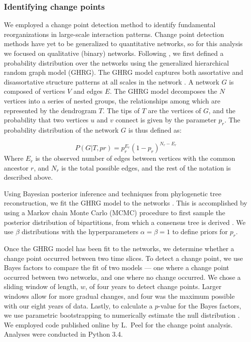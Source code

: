 \documentclass[12pt]{article}
\begin{document}
\subsubsection*{Identifying change points}
We employed a change point detection method \citep{peel2014detecting}
to identify fundamental reorganizations in large-scale interaction
patterns. Change point detection methods have yet to be generalized to
quantitative networks, so for this analysis we focused on qualitative
(binary) networks. Following \cite{peel2014detecting}, we first
defined a probability distribution over the networks using the
generalized hierarchical random graph model (GHRG). The GHRG model
captures both assortative and disassortative structure patterns at all
scales in the network \citep{peel2014detecting}. A network $G$ is
composed of vertices $V$ and edges $E$. The GHRG model decomposes the
$N$ vertices into a series of nested groups, the relationships among
which are represented by the dendrogram $T$. The tips of $T$ are the
vertices of $G$, and the probability that two vertices $u$ and $v$
connect is given by the parameter $p_r$. The probability distribution
of the network $G$ is thus defined as:

\begin{equation}
  \label{eq:lik}
  P(G|T,{pr}) = p_r^{E_r}(1-p_r)^{N_r-E_r}
\end{equation}
% 
Where $E_r$ is the observed number of edges between vertices with the
common ancestor $r$, and $N_r$ is the total possible edges, and the
rest of the notation is described above.

Using Bayesian posterior inference and techniques from phylogenetic
tree reconstruction, we fit the GHRG model to the networks
\citep{peel2014detecting}. This is accomplished by using a Markov
chain Monte Carlo (MCMC) procedure to first sample the posterior
distribution of bipartitions, from which a consensus tree is derived
\citep{peel2014detecting}. We use $\beta$ distributions with the
hyperparameters $\alpha=\beta=1$ to define priors for $p_r$.

Once the GHRG model has been fit to the networks, we determine whether
a change point occurred between two time slices. To detect a change
point, we use Bayes factors to compare the fit of two models --- one
where a change point occurred between two networks, and one where no
change occurred. We chose a sliding window of length, $w$, of four
years to detect change points. Larger windows allow for more gradual
changes, and four was the maximum possible with our eight years of
data. Lastly, to calculate a $p$-value for the Bayes factors, we use
parametric bootstrapping to numerically estimate the null distribution
\citep{peel2014detecting}. We employed code published online by
L.~Peel for the change point analysis. Analyses were conducted in
Python 3.4.
\end{document}
